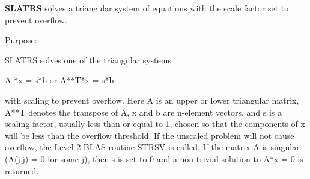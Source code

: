 {\bfseries S\+L\+A\+T\+R\+S} solves a triangular system of equations with the scale factor set to prevent overflow. 

 \begin{DoxyParagraph}{Purpose\+: }
\begin{DoxyVerb} SLATRS solves one of the triangular systems

    A *x = s*b  or  A**T*x = s*b

 with scaling to prevent overflow.  Here A is an upper or lower
 triangular matrix, A**T denotes the transpose of A, x and b are
 n-element vectors, and s is a scaling factor, usually less than
 or equal to 1, chosen so that the components of x will be less than
 the overflow threshold.  If the unscaled problem will not cause
 overflow, the Level 2 BLAS routine STRSV is called.  If the matrix A
 is singular (A(j,j) = 0 for some j), then s is set to 0 and a
 non-trivial solution to A*x = 0 is returned.\end{DoxyVerb}
 
\end{DoxyParagraph}

